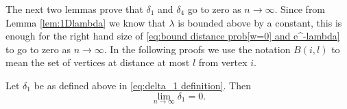	The next two lemmas prove that $\delta_1$ and $\delta_4$ go to zero as $n \rightarrow \infty$. Since from Lemma \ref{lem:1Dlambda} we know that $\lambda$ is bounded above by a constant, this is enough for the right hand size of \eqref{eq:bound distance prob[w=0] and e^-lambda} to go to zero as $n \rightarrow \infty$. In the following proofs we use the notation $B(i, l)$ to mean the set of vertices at distance at most $l$ from vertex $i$.

	\begin{lemma}
	\label{lem:delta1 goes to 0}
		Let $\delta_1$ be as defined above in \eqref{eq:delta_1 definition}. Then
		\begin{equation}
			\lim_{n\rightarrow\infty} \delta_1 = 0.
		\end{equation}
	\end{lemma}
